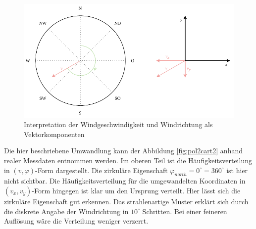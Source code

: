 \documentclass[
12pt, %
toc=listofnumbered, %
toc=chapterentrydotfill, %
numbers=noenddot, %
captions=tableheading, %
bibliography=numbered
]{scrreprt}
\begin{document}
\begin{figure}[tph]
	\begin{center}
		\includegraphics[scale = 1]{./images/pol2cart.pdf}
		\caption{Interpretation der Windgeschwindigkeit und Windrichtung als Vektorkomponenten}
		\label{fig:pol2cart}
	\end{center}
\end{figure}

Die hier beschriebene Umwandlung kann der Abbildung \ref{fig:pol2cart2} anhand realer Messdaten entnommen werden. Im oberen Teil ist die Häufigkeitsverteilung in $(v,\varphi)$-Form dargestellt. Die zirkuläre Eigenschaft $\varphi_{north} = 0^\circ = 360^\circ$ ist hier nicht sichtbar. Die Häufigkeitsverteilung für die umgewandelten Koordinaten in $(v_x,v_y)$-Form hingegen ist klar um den Ursprung verteilt. Hier lässt sich die zirkuläre Eigenschaft gut erkennen. Das strahlenartige Muster erklärt sich durch die diskrete Angabe der Windrichtung in $10^\circ$ Schritten. Bei einer feineren Auflösung wäre die Verteilung weniger verzerrt.
\end{document}
